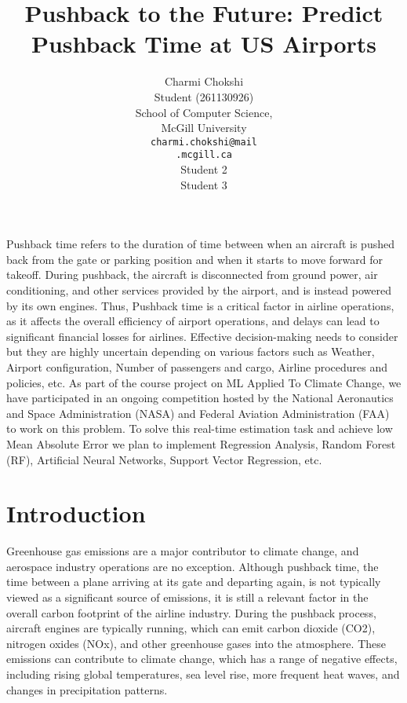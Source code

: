 \documentclass[11pt]{article}
\title{Pushback to the Future: Predict Pushback Time at US Airports}
\author{Charmi Chokshi \\
  Student (261130926) \\
  School of Computer Science, \\
  McGill University \\
   \texttt{charmi.chokshi@mail} \\
   \texttt{.mcgill.ca} \\ \And
   Student 2 \\ \And
   Student 3    
  }
\begin{document}
\linenumbers

\maketitle
\begin{abstract}

\end{abstract}

Pushback time refers to the duration of time between when an aircraft is pushed back from the gate or parking position and when it starts to move forward for takeoff. During pushback, the aircraft is disconnected from ground power, air conditioning, and other services provided by the airport, and is instead powered by its own engines. Thus, Pushback time is a critical factor in airline operations, as it affects the overall efficiency of airport operations, and delays can lead to significant financial losses for airlines. Effective decision-making needs to consider but they are highly uncertain depending on various factors such as Weather, Airport configuration, Number of passengers and cargo, Airline procedures and policies, etc. As part of the course project on ML Applied To Climate Change, we have participated in an ongoing competition \cite{drivendata} hosted by the National Aeronautics and Space Administration (NASA) and Federal Aviation Administration (FAA) to work on this problem. To solve this real-time estimation task and achieve low Mean Absolute Error we plan to implement Regression Analysis, Random Forest (RF), Artificial Neural Networks, Support Vector Regression, etc.

\section{Introduction}

Greenhouse gas emissions are a major contributor to climate change, and aerospace industry operations are no exception. Although pushback time, the time between a plane arriving at its gate and departing again, is not typically viewed as a significant source of emissions, it is still a relevant factor in the overall carbon footprint of the airline industry. During the pushback process, aircraft engines are typically running, which can emit carbon dioxide (CO2), nitrogen oxides (NOx), and other greenhouse gases into the atmosphere. These emissions can contribute to climate change, which has a range of negative effects, including rising global temperatures, sea level rise, more frequent heat waves, and changes in precipitation patterns. \\
\end{document}
